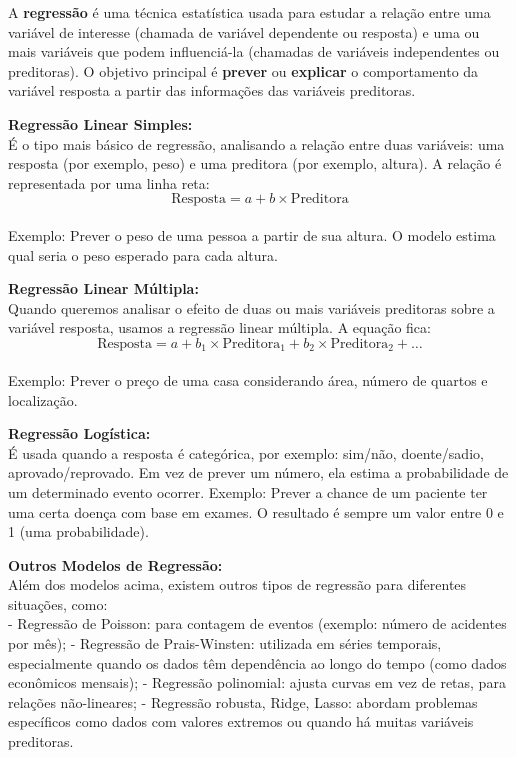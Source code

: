 \documentclass[
]{book}
\begin{document}
A \textbf{regressão} é uma técnica estatística usada para estudar a relação entre uma variável de interesse (chamada de variável dependente ou resposta) e uma ou mais variáveis que podem influenciá-la (chamadas de variáveis independentes ou preditoras). O objetivo principal é \textbf{prever} ou \textbf{explicar} o comportamento da variável resposta a partir das informações das variáveis preditoras.

\textbf{Regressão Linear Simples:}\\
É o tipo mais básico de regressão, analisando a relação entre duas variáveis: uma resposta (por exemplo, peso) e uma preditora (por exemplo, altura). A relação é representada por uma linha reta:\\
\[
\text{Resposta} = a + b \times \text{Preditora}
\]\\
Exemplo: Prever o peso de uma pessoa a partir de sua altura. O modelo estima qual seria o peso esperado para cada altura.

\textbf{Regressão Linear Múltipla:}\\
Quando queremos analisar o efeito de duas ou mais variáveis preditoras sobre a variável resposta, usamos a regressão linear múltipla. A equação fica:\\
\[
\text{Resposta} = a + b_1 \times \text{Preditora}_1 + b_2 \times \text{Preditora}_2 + \ldots
\]\\
Exemplo: Prever o preço de uma casa considerando área, número de quartos e localização.

\textbf{Regressão Logística:}\\
É usada quando a resposta é categórica, por exemplo: sim/não, doente/sadio, aprovado/reprovado. Em vez de prever um número, ela estima a probabilidade de um determinado evento ocorrer. Exemplo: Prever a chance de um paciente ter uma certa doença com base em exames. O resultado é sempre um valor entre 0 e 1 (uma probabilidade).

\textbf{Outros Modelos de Regressão:}\\
Além dos modelos acima, existem outros tipos de regressão para diferentes situações, como:\\
- Regressão de Poisson: para contagem de eventos (exemplo: número de acidentes por mês);
- Regressão de Prais-Winsten: utilizada em séries temporais, especialmente quando os dados têm dependência ao longo do tempo (como dados econômicos mensais);
- Regressão polinomial: ajusta curvas em vez de retas, para relações não-lineares;
- Regressão robusta, Ridge, Lasso: abordam problemas específicos como dados com valores extremos ou quando há muitas variáveis preditoras.
\end{document}
